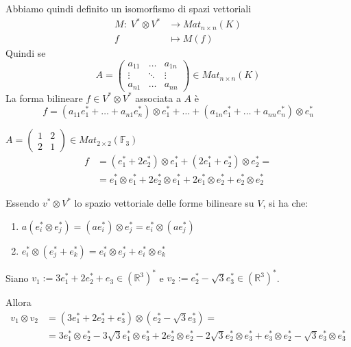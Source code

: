 \documentclass[../main.tex]{subfiles}
\begin{document}
Abbiamo quindi definito un isomorfismo di spazi vettoriali
\begin{align*}
    M : \;  V^* \otimes V^* & \rightarrow Mat_{n \times n}(K) \\
    f                       & \mapsto M(f)
\end{align*}
Quindi se
\begin{equation*}
    A = \begin{pmatrix}
        a_{11} & \ldots & a_{1n} \\
        \vdots & \ddots & \vdots \\
        a_{n1} & \ldots & a_{nn}
    \end{pmatrix} \in Mat_{n \times n}(K)
\end{equation*}
La forma bilineare $f \in V^* \otimes V^*$ associata a $A$ è
\begin{equation*}
    f = (a_{11} e_1^* + \ldots + a_{n1}e_n^*) \otimes e_1^* +
    \ldots
    + (a_{1n} e_1^* + \ldots + a_{nn}e_n^*) \otimes e_n^*
\end{equation*}
\begin{example}
    $A = \begin{pmatrix}
            1 & 2 \\
            2 & 1
        \end{pmatrix} \in Mat_{2 \times 2}(\mathbb{F}_3)$
    \begin{align*}
        f & = (e_1^* + 2e_2^*) \otimes e_1^* + (2e_1^* + e_2^*) \otimes e_2^* =                        \\
          & = e_1^* \otimes e_1^* + 2 e_2^* \otimes e_1^* + 2e_1^* \otimes e_2^* + e_2^* \otimes e_2^*
    \end{align*}
\end{example}
\begin{note}
    Essendo $v^* \otimes V^*$ lo spazio vettoriale delle forme bilineare su $V$, si ha che:
    \begin{enumerate}
        \item $a(e_i^* \otimes e_j^*) = (a e_i^*) \otimes e_j^* = e_i^* \otimes (ae_j^*)$
        \item $e_i^* \otimes (e_j^* + e_k^*) = e_i^* \otimes e_j^* + e_i^* \otimes e_k^*$
    \end{enumerate}
\end{note}

\begin{example}
    Siano $v_1 := 3e_1^* + 2e_2^* + e_3 \in (\mathbb{R}^3)^*$ e $v_2 := e_2^* - \sqrt{3} e_3^* \in (\mathbb{R}^3)^*$.

    Allora
    \begin{align*}
        v_1 \otimes v_2 & = (3e_1^* + 2e_2^* + e_3^*) \otimes (e_2^* - \sqrt{3} e_3^*) =                                                                                                     \\
                        & = 3e_1^* \otimes e_2^* - 3\sqrt{3} e_1^* \otimes e_3^* + 2e_2^* \otimes e_2^* - 2\sqrt{3} e_2^* \otimes e_3^* + e_3^* \otimes e_2^* - \sqrt{3} e_3^* \otimes e_3^*
    \end{align*}
\end{example}
\end{document}
